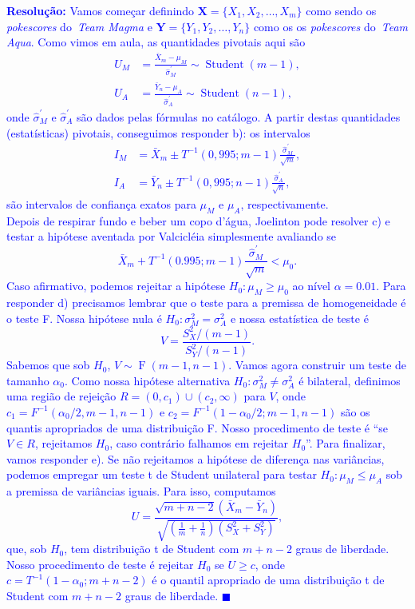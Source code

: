 \documentclass[a4paper,10pt, notitlepage]{report}
\newcommand{\bX}{\boldsymbol{X}} %
\begin{document}
\textcolor{blue}{
\textbf{Resolução:}
Vamos começar definindo $\bX = \{X_1, X_2, \ldots, X_m\}$ como sendo os \textit{pokescores} do~\textit{Team Magma} e $\boldsymbol{Y} = \{Y_1, Y_2, \ldots, Y_n\}$ como os os \textit{pokescores} do~\textit{Team Aqua}.
Como vimos em aula, as quantidades pivotais aqui são
\begin{align*}
 U_M &= \frac{\bar{X}_m - \mu_M}{\hat{\sigma}_M^\prime} \sim \operatorname{Student}(m-1),\\
 U_A &= \frac{\bar{Y}_n - \mu_A}{\hat{\sigma}_A^\prime} \sim \operatorname{Student}(n-1),
\end{align*}
onde $\hat{\sigma}_M^\prime$ e $\hat{\sigma}_A^\prime$ são dados pelas fórmulas no catálogo.
A partir destas quantidades (estatísticas) pivotais, conseguimos responder b): os intervalos
\begin{align*}
 I_M & = \bar{X}_m \pm T^{-1}(0,995; m- 1)\frac{\hat{\sigma}_M^\prime}{\sqrt{m}},\\
 I_A & = \bar{Y}_n \pm T^{-1}(0,995; n- 1)\frac{\hat{\sigma}_A^\prime}{\sqrt{n}},
\end{align*}
são intervalos de confiança exatos para $\mu_M$ e $\mu_A$, respectivamente.\\
Depois de respirar fundo e beber um copo d'água, Joelinton pode resolver c) e testar a hipótese aventada por Valcicléia simplesmente avaliando se 
$$ \bar{X}_m + T^{-1}(0.995; m- 1)\frac{\hat{\sigma}_M^\prime}{\sqrt{m}} < \mu_0.$$
Caso afirmativo, podemos rejeitar a hipótese $H_0: \mu_M \geq \mu_0$ ao nível $\alpha = 0.01$.
Para responder d) precisamos lembrar que o teste para a premissa de homogeneidade é o teste F.
Nossa hipótese nula é $H_0: \sigma^2_M = \sigma^2_A$ e nossa estatística de teste é 
$$  V = \frac{S_X^2/(m-1)}{S_Y^2/(n-1)}. $$
Sabemos que sob $H_0$, $V \sim\operatorname{F}(m-1, n-1)$.
Vamos agora construir um teste de tamanho $\alpha_0$.
Como nossa hipótese alternativa $H_0: \sigma^2_M \neq \sigma^2_A$ é bilateral, definimos uma região de rejeição $R = (0, c_1) \cup (c_2, \infty)$ para $V$, onde $c_1 = F^{-1}(\alpha_0/2, m-1, n-1)$ e $c_2 = F^{-1}(1-\alpha_0/2; m-1, n-1)$ são os quantis apropriados de uma distribuição F. 
Nosso procedimento de teste é ``se $V \in R$, rejeitamos $H_0$, caso contrário falhamos em rejeitar $H_0$''.
Para finalizar, vamos responder e).
Se não rejeitamos a hipótese de diferença nas variâncias, podemos empregar um teste t de Student unilateral para testar $H_0: \mu_M \leq \mu_A$ sob a premissa de variâncias iguais.
Para isso, computamos
$$ U = \frac{\sqrt{m + n - 2}(\bar{X}_m - \bar{Y}_n)}{\sqrt{\left(\frac{1}{m} + \frac{1}{n}\right) (S_X^2 + S_Y^2)}},$$
que, sob $H_0$, tem distribuição t de Student com $m + n-2$ graus de liberdade.
Nosso procedimento de teste é rejeitar $H_0$ se $U \geq c$, onde $c = T^{-1}(1-\alpha_0; m + n -2)$ é o quantil apropriado de uma distribuição t de Student com $m + n -2$ graus de liberdade.
$\blacksquare$
}
\end{document}
